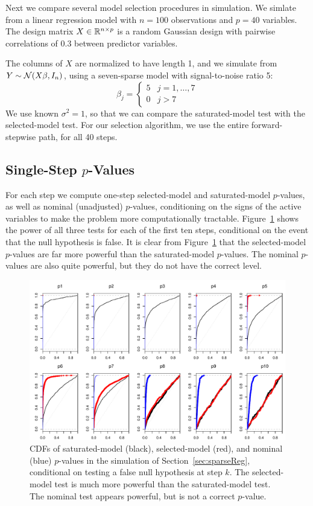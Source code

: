 \documentclass{article}
\begin{document}
Next we compare several model selection procedures in simulation. We simlate from a linear regression model with $n=100$ observations and $p=40$ variables. The design matrix $X\in\mathbb{R}^{n\times p}$ is a random Gaussian design with pairwise correlations of 0.3 between predictor variables.

The columns of $X$ are normalized to have length 1, and we simulate from $Y \sim \mathcal{N}(X\beta,I_n)$, using a seven-sparse model with signal-to-noise ratio 5:
\[
\beta_j = \left\{\begin{matrix}5 & j = 1,\ldots,7\\ 0 &
    j>7\end{matrix}\right.
\]
We use known $\sigma^2=1$, so that we can compare the saturated-model test with the selected-model test. For our selection algorithm, we use the entire forward-stepwise path, for all 40 steps. 

\subsection{Single-Step $p$-Values}

For each step we compute one-step selected-model and saturated-model $p$-values, as well as nominal (unadjusted) $p$-values, conditioning on the signs of the active variables to make the problem more computationally tractable. Figure~\ref{fig:simulation_null_false} shows the power of all three tests for each of the first ten steps, conditional on the event that the null hypothesis is false. It is clear from Figure~\ref{fig:simulation_null_false} that the selected-model $p$-values are far more powerful than the saturated-model $p$-values. The nominal $p$-values are also quite powerful, but they do not have the correct level.

\begin{figure}
  \centering
  \includegraphics[width=.8\textwidth]{figs/simulation_snr_5_alpha_05_null_false.pdf}
  \caption{CDFs of saturated-model (black), selected-model (red), and nominal (blue) $p$-values in the simulation of Section~\ref{sec:sparseReg}, conditional on testing a false null hypothesis at step $k$. The selected-model test is much more powerful than the saturated-model test. The nominal test appears powerful, but is not a correct $p$-value.}
  \label{fig:simulation_null_false}
\end{figure}
\end{document}
